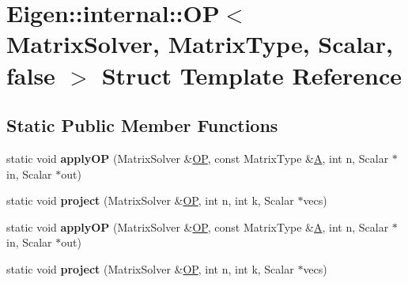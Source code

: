 \hypertarget{struct_eigen_1_1internal_1_1_o_p_3_01_matrix_solver_00_01_matrix_type_00_01_scalar_00_01false_01_4}{}\section{Eigen\+:\+:internal\+:\+:OP$<$ Matrix\+Solver, Matrix\+Type, Scalar, false $>$ Struct Template Reference}
\label{struct_eigen_1_1internal_1_1_o_p_3_01_matrix_solver_00_01_matrix_type_00_01_scalar_00_01false_01_4}
\subsection*{Static Public Member Functions}
\begin{DoxyCompactItemize}
\item 
\mbox{\label{struct_eigen_1_1internal_1_1_o_p_3_01_matrix_solver_00_01_matrix_type_00_01_scalar_00_01false_01_4_aef25eae361c08f8d3c8974cd244871df}} 
static void {\bfseries apply\+OP} (Matrix\+Solver \&\hyperlink{struct_eigen_1_1internal_1_1_o_p}{OP}, const Matrix\+Type \&\hyperlink{group___core___module_class_eigen_1_1_matrix}{A}, int n, Scalar $\ast$in, Scalar $\ast$out)
\item 
\mbox{\label{struct_eigen_1_1internal_1_1_o_p_3_01_matrix_solver_00_01_matrix_type_00_01_scalar_00_01false_01_4_a39686f2a8d34dca1b2c79da7467a78fa}} 
static void {\bfseries project} (Matrix\+Solver \&\hyperlink{struct_eigen_1_1internal_1_1_o_p}{OP}, int n, int k, Scalar $\ast$vecs)
\item 
\mbox{\label{struct_eigen_1_1internal_1_1_o_p_3_01_matrix_solver_00_01_matrix_type_00_01_scalar_00_01false_01_4_aef25eae361c08f8d3c8974cd244871df}} 
static void {\bfseries apply\+OP} (Matrix\+Solver \&\hyperlink{struct_eigen_1_1internal_1_1_o_p}{OP}, const Matrix\+Type \&\hyperlink{group___core___module_class_eigen_1_1_matrix}{A}, int n, Scalar $\ast$in, Scalar $\ast$out)
\item 
\mbox{\label{struct_eigen_1_1internal_1_1_o_p_3_01_matrix_solver_00_01_matrix_type_00_01_scalar_00_01false_01_4_a39686f2a8d34dca1b2c79da7467a78fa}} 
static void {\bfseries project} (Matrix\+Solver \&\hyperlink{struct_eigen_1_1internal_1_1_o_p}{OP}, int n, int k, Scalar $\ast$vecs)
\end{DoxyCompactItemize}


